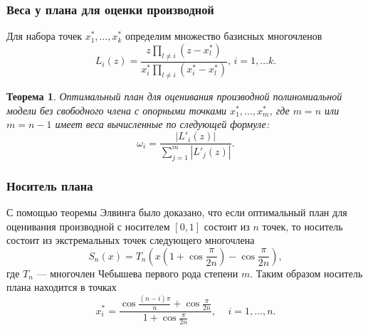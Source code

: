 \documentclass[unicode, notheorems, minimal, nologo, handout]{beamer}
\newtheorem{theorem}{Теорема}
\newcommand\abs[1]{\left\lvert#1\right\rvert}
\begin{document}
\begin{frame}
	\frametitle{Веса у плана для оценки производной \citep{melasmain}}
	Для набора точек $x_1^*, \ldots, x_k^*$ определим множество базисных многочленов
	\begin{equation*}
		L_i(z) = \frac{z \prod_{l \neq i} (z - x_l^*)}{x_i^* \prod_{l \neq i} (x_i^* - x_l^*)}, \, i = 1, \dots k.
	\end{equation*}
	
	\begin{theorem}
		Оптимальный план для оценивания производной полиномиальной модели без свободного члена с опорными точками $x_1^*, \ldots, x_m^*$, где $m=n$ или $m=n-1$ имеет веса вычисленные по следующей формуле:	
	\begin{equation*}
		\omega_i = \frac{\abs{L'_i(z)}}{\sum_{j=1}^m \abs{L'_j(z)}}.
	\end{equation*}
	\end{theorem}
	
\end{frame}

\begin{frame}
	\frametitle{Носитель плана}
	С помощью теоремы Элвинга было доказано, что если оптимальный план для оценивания производной с носителем $[0, 1]$ состоит из $n$ точек, то носитель состоит из экстремальных точек следующего многочлена
	\begin{equation*}
		S_n(x) = T_n \left(x \left(1 + \cos \frac{\pi}{2n} \right) - \cos \frac{\pi}{2n} \right),
	\end{equation*}
	где $T_n$ --- многочлен Чебышева первого рода степени $m$. Таким образом носитель плана находится в точках
	\begin{equation*}
		x_i^* = \frac{\cos \frac{(n - i) \pi}{n} + \cos \frac{\pi}{2n}}{1 + \cos \frac{\pi}{2n}} , \, \quad i = 1, \ldots, n.
	\end{equation*}
	
\end{frame}
\end{document}
